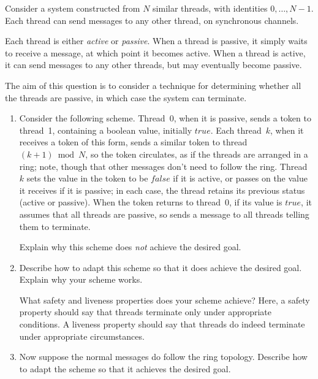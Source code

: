 \begin{question}
Consider a system constructed from $N$ similar threads, with identities
$0, \ldots, N-1$.  Each thread can send messages to any other thread, on
synchronous channels.

Each thread is either \emph{active} or \emph{passive}.  When a thread is
passive, it simply waits to receive a message, at which point it becomes
active.  When a thread is active, it can send messages to any other
threads, but may eventually become passive.

The aim of this question is to consider a technique for determining whether
all the threads are passive, in which case the system can terminate.

\begin{enumerate}
\item Consider the following scheme.  Thread~0, when it is passive, sends a
token to thread~1, containing a boolean value, initially $true$.  Each
thread~$k$, when it receives a token of this form, sends a similar token to
thread~$(k+1) \bmod N$, so the token circulates, as if the threads are
arranged in a ring; note, though that other messages don't need to follow the
ring.  Thread~$k$ sets the value in the token to be $false$ if it is active,
or passes on the value it receives if it is passive; in each case, the thread
retains its previous status (active or passive).  When the token returns to
thread~0, if its value is $true$, it assumes that all threads are passive,
so sends a message to all threads telling them to terminate.

Explain why this scheme does \emph{not} achieve the desired goal.


\item
Describe how to adapt this scheme so that it does achieve the desired goal.
Explain why your scheme works.  

What safety and liveness properties does your scheme achieve?  Here, a safety
property should say that threads terminate only under appropriate conditions.
A liveness property should say that threads do indeed terminate under
appropriate circumstances.


\item
Now suppose the normal messages do follow the ring topology.  Describe how to
adapt the scheme so that it achieves the desired goal. 

\end{enumerate}
\end{question}

